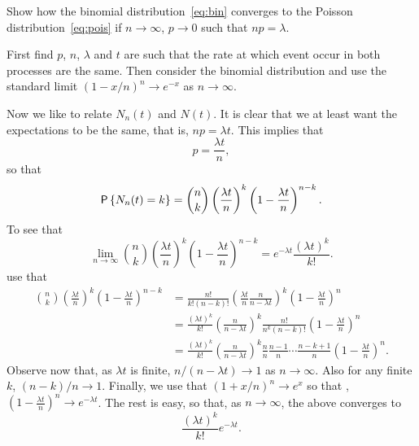 \begin{question}
  Show how the binomial distribution~\eqref{eq:bin} converges to the
  Poisson distribution~\eqref{eq:pois} if $n\to\infty$, $p\to0$ such
  that $np=\lambda$. 

  \begin{hint}
First find $p$, $n$, $\lambda$ and $t$ are such that the rate
    at which event occur in both processes are the same. Then consider
    the binomial distribution and use the standard limit
    $(1-x/n)^n \to e^{-x}$ as $n\to \infty$. 
  \end{hint}

  \begin{solution} Now we like to relate $N_n(t)$ and $N(t)$. It is
    clear that we at least want the expectations to be the same, that
    is, $np = \lambda t$. This implies that
\begin{equation*}
  p = \frac{\lambda t}n,
\end{equation*}
so that 
\begin{equation*}
  \P{N_n(t) = k} = {n \choose k} \left(\frac{\lambda t}{n}\right)^k \left(1-\frac{\lambda t}n\right)^{n-k}.
\end{equation*}
To see that 
\begin{equation*}\label{eq:52}
  \lim_{n\to\infty} {n \choose k} \left(\frac{\lambda t}{n}\right)^k \left(1-\frac{\lambda t}n\right)^{n-k} = e^{-\lambda t} \frac{(\lambda t)^k}{k!}.
\end{equation*}
use that
    \begin{equation*}
      \begin{split}
      {n \choose k} \left(\frac{\lambda t}{n}\right)^k \left(1-\frac{\lambda t}n\right)^{n-k} 
&= \frac{n!}{k!(n-k)!} \left(\frac{\lambda t}{n}\frac{n}{n-\lambda t}\right)^k \left(1-\frac{\lambda t}n\right)^{n} \\
&= \frac{(\lambda t)^k}{k!} \left(\frac n{n-\lambda t} \right)^k  \frac{n!}{n^k(n-k)!}\left(1-\frac{\lambda t}n\right)^{n}\\
&= \frac{(\lambda t)^k}{k!} \left(\frac n{n-\lambda t} \right)^k \frac{n}{n}\frac{n-1}{n}\cdots\frac{n-k+1}{n} \left(1-\frac{\lambda t}n\right)^{n}.
\end{split}
\end{equation*}
Observe now that, as $\lambda t$ is finite, $n/(n-\lambda t)\to 1$ as
$n\to \infty$. Also for any finite $k$, $(n-k)/n\to1$. Finally, we use
that $(1+x/n)^n\to e^{x}$ so that ,
$\left(1-\frac{\lambda t}n\right)^{n} \to e^{-\lambda t}$.  The rest
is easy, so that, as $n\to\infty$,  the above converges to 
\begin{equation*}
\frac{(\lambda t)^k}{k!} e^{-\lambda t}.
\end{equation*}

  \end{solution}
\end{question}


